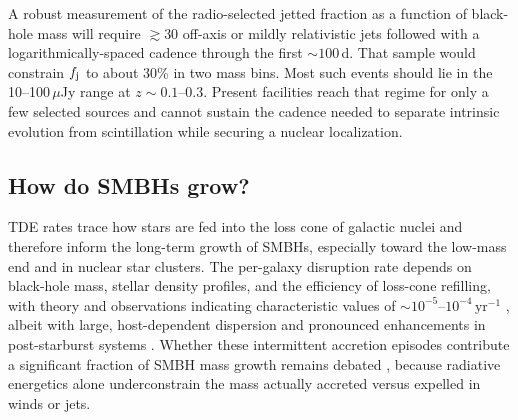\documentclass[a4paper,11pt]{article}
\begin{document}
A robust measurement of the radio-selected jetted fraction as a function of black-hole mass will require $\gtrsim 30$ off-axis or mildly relativistic jets followed with a logarithmically-spaced cadence through the first $\sim 100$\,d. That sample would constrain $f_{\rm j}$ to about 30\% in two mass bins. Most such events should lie in the 10--100\,$\mu$Jy range at $z\sim 0.1$--0.3. Present facilities reach that regime for only a few selected sources and cannot sustain the cadence needed to separate intrinsic evolution from scintillation while securing a nuclear localization.

\subsection{How do SMBHs grow?
}

TDE rates trace how stars are fed into the loss cone of galactic nuclei and therefore inform the long-term growth of SMBHs, especially toward the low-mass end and in nuclear star clusters. The per-galaxy disruption rate depends on black-hole mass, stellar density profiles, and the efficiency of loss-cone refilling, with theory and observations indicating characteristic values of $\sim 10^{-5}$--$10^{-4}\,\mathrm{yr}^{-1}$ \citep{Magorrian1999,Stone2016,Yao2024}, albeit with large, host-dependent dispersion and pronounced enhancements in post-starburst systems \citep{French2020,LawSmith2017}. Whether these intermittent accretion episodes contribute a significant fraction of SMBH mass growth remains debated \citep{LuKumar2018,Dai2021}, because radiative energetics alone underconstrain the mass actually accreted versus expelled in winds or jets.  
\end{document}
